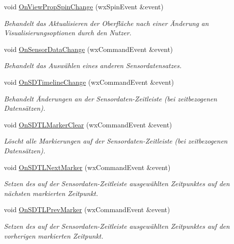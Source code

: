 \begin{DoxyCompactItemize}
void \hyperlink{classGUIMainWindow_a9d642647d7cb73e34ef88c76438206a7}{On\-View\-Prop\-Spin\-Change} (wx\-Spin\-Event \&event)
\begin{DoxyCompactList}\small\item\em Behandelt das Aktualisieren der Oberfläche nach einer Änderung an Visualisierungsoptionen durch den Nutzer. \end{DoxyCompactList}\item 
void \hyperlink{classGUIMainWindow_a98249bb199993ad5920cf81f4b4a350a}{On\-Sensor\-Data\-Change} (wx\-Command\-Event \&event)
\begin{DoxyCompactList}\small\item\em Behandelt das Auswählen eines anderen Sensordatensatzes. \end{DoxyCompactList}\item 
void \hyperlink{classGUIMainWindow_a791d688a11d58c514ca4a892f2b69b07}{On\-S\-D\-Timeline\-Change} (wx\-Command\-Event \&event)
\begin{DoxyCompactList}\small\item\em Behandelt Änderungen an der Sensordaten-\/\-Zeitleiste (bei zeitbezogenen Datensätzen). \end{DoxyCompactList}\item 
void \hyperlink{classGUIMainWindow_a8fe683ef74029b5b22d7d7cdea4f46f5}{On\-S\-D\-T\-L\-Marker\-Clear} (wx\-Command\-Event \&event)
\begin{DoxyCompactList}\small\item\em Löscht alle Markierungen auf der Sensordaten-\/\-Zeitleiste (bei zeitbezogenen Datensätzen). \end{DoxyCompactList}\item 
void \hyperlink{classGUIMainWindow_a683581567b0fd6fbd8e84b160a81aac7}{On\-S\-D\-T\-L\-Next\-Marker} (wx\-Command\-Event \&event)
\begin{DoxyCompactList}\small\item\em Setzen des auf der Sensordaten-\/\-Zeitleiste ausgewählten Zeitpunktes auf den nächsten markierten Zeitpunkt. \end{DoxyCompactList}\item 
void \hyperlink{classGUIMainWindow_ab41592f7f45ab81dd3a1b663b18ece50}{On\-S\-D\-T\-L\-Prev\-Marker} (wx\-Command\-Event \&event)
\begin{DoxyCompactList}\small\item\em Setzen des auf der Sensordaten-\/\-Zeitleiste ausgewählten Zeitpunktes auf den vorherigen markierten Zeitpunkt. \end{DoxyCompactList}\item 

\end{DoxyCompactItemize}
